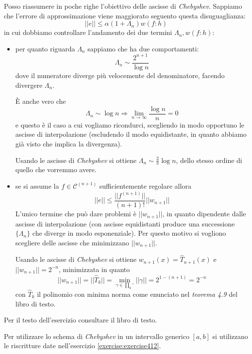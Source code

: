 \begin{oss}
Posso riassumere in poche righe l'obiettivo delle ascisse di \emph{Chebyshev}.
Sappiamo che l'errore di approssimazione viene maggiorato seguento questa
disuguaglianza:
\begin{displaymath}
||e|| \leq \alpha (1 + \Lambda_{n}) w(f:h)
\end{displaymath}
in cui dobbiamo controllare l'andamento dei due termini $\Lambda_{n}, w(f:h)$:
\begin{itemize}
  \item per quanto riguarda $\Lambda_{n}$ sappiamo che ha due comportamenti:
  $$\Lambda_{n} \sim \frac{2^{n+1}}{\log{n}}$$ dove il numeratore diverge pi\`u
  velocemente del denominatore, facendo divergere $\Lambda_{n}$.
  
  \`E anche vero che $$\Lambda_{n} \sim \log{n} \Rightarrow \lim_{n \rightarrow
  \infty}{\frac{\log{n}}{n}} = 0$$ e questo \`e il caso a cui vogliamo
  ricondurci, scegliendo in modo opportuno le ascisse di interpolazione 
  (escludendo il modo equidistante, in quanto abbiamo gi\`a visto che implica 
  la divergenza).
  
  Usando le ascisse di \emph{Chebyshev} si ottiene $\Lambda_{n} \sim
  \frac{2}{\pi}\log{n}$, dello stesso ordine di quello che vorremmo avere.
  \item se si assume la $f \in \mathcal{C}^{(n+1)}$ sufficientemente regolare
  allora $$||e|| \leq \frac{||f^{(n+1)}||}{(n+1)!}||w_{n+1}||$$
  L'unico termine
  che pu\`o dare problemi \`e $||w_{n+1}||$, in quanto dipendente dalle ascisse
  di interpolazione (con ascisse equidistanti produce una successione
  $\{\Lambda_{n}\}$ che diverge in modo esponenziale). Per questo motivo si
  vogliono scegliere delle ascisse che minimizzano $||w_{n+1}||$.
  
  Usando le ascisse di \emph{Chebyshev} si ottiene $w_{n+1}(x) =
  \hat{T}_{n+1}(x)$ e $||w_{n+1}|| = 2^{-n}$, minimizzata in quanto
  $$||w_{n+1}|| = ||\hat{T}_{k}|| = \min_{\gamma \in \prod_{k}'}{||\gamma||} =
  2^{1-(n+1)} = 2^{-n}$$
  con $\hat{T}_{k}$ il polinomio con minima norma come enunciato nel
  \emph{teorema 4.9} del libro di testo.
\end{itemize}
\end{oss}

\begin{exercise}[4.14]
Per il testo dell'esercizio consultare il libro di testo.
\end{exercise}
Per utilizzare lo schema di \emph{Chebyshev} in un intervallo generico $[a,b]$
si utilizzano le riscritture date nell'esercizio \ref{exercise:exercise412}. 

